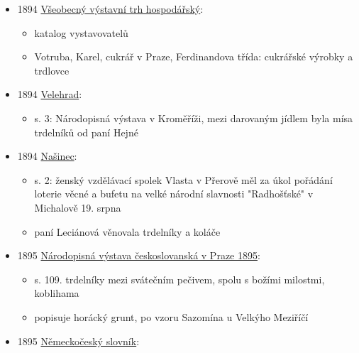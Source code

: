 \begin{itemize}
  \begin{itemize}
  \tightlist
  \item
    s. 3: další článek o výstavě ve Šlapanicích, trdelníky tu asi byly i
    jako formy mezi kuchyňským nádobím
  \end{itemize}
\item
  1894
  \href{https://ndk.cz/uuid/uuid:ab9cd010-b908-11dc-83b0-000d606f5dc6}{Všeobecný
  výstavní trh hospodářský}:

  \begin{itemize}
  \tightlist
  \item
    katalog vystavovatelů
  \item
    Votruba, Karel, cukrář v Praze, Ferdinandova třída: cukrářské
    výrobky a trdlovce
  \end{itemize}
\item
  1894
  \href{https://ceskadigitalniknihovna.cz/uuid/uuid:c041b7c0-a37f-11de-95bf-000d606f5dc6}{Velehrad}:

  \begin{itemize}
  \tightlist
  \item
    s. 3: Národopisná výstava v Kroměříži, mezi darovaným jídlem byla
    mísa trdelníků od paní Hejné
  \end{itemize}
\item
  1894
  \href{https://ceskadigitalniknihovna.cz/uuid/uuid:a0df34ac-8228-11e0-b92b-0050569d679d}{Našinec}:

  \begin{itemize}
  \tightlist
  \item
    s. 2: ženský vzdělávací spolek Vlasta v Přerově měl za úkol pořádání
    loterie věcné a bufetu na velké národní slavnosti "Radhošťské" v
    Michalově 19. srpna
  \item
    paní Leciánová věnovala trdelníky a koláče
  \end{itemize}
\item
  1895
  \href{https://ndk.cz/uuid/uuid:a69c34d0-f3fe-11dc-a2df-000d606f5dc6}{Národopisná
  výstava českoslovanská v Praze 1895}:

  \begin{itemize}
  \tightlist
  \item
    s. 109. trdelníky mezi svátečním pečivem, spolu s božími milostmi,
    koblihama
  \item
    popisuje horácký grunt, po vzoru Sazomína u Velkýho Meziříčí
  \end{itemize}
\item
  1895
  \href{https://ceskadigitalniknihovna.cz/uuid/uuid:a7ab5cf0-1dae-11e7-a38c-005056827e51}{Německočeský
  slovník}:


\end{itemize}
